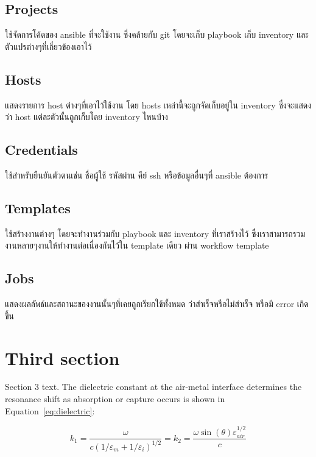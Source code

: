 \subsection{Projects}
\hspace{0.5in} ใช้จัดการโค้ดของ ansible ที่จะใช้งาน ซึ่งคล้ายกับ git โดยจะเก็บ playbook เก็บ inventory และตัวแปรต่างๆที่เกี่ยวข้องเอาไว้

\subsection{Hosts}
\hspace{0.5in} แสดงรายการ host ต่างๆที่เอาไว้ใช้งาน โดย hosts เหล่านี้จะถูกจัดเก็บอยู่ใน inventory ซึ่งจะแสดงว่า host แต่ละตัวนั้นถูกเก็บโดย inventory ไหนบ้าง

\subsection{Credentials}
\hspace{0.5in} ใช้สำหรับยืนยันตัวตนเช่น ชื่อผู้ใช้ รหัสผ่าน คีย์ ssh หรือข้อมูลอื่นๆที่ ansible ต้องการ

\subsection{Templates}
\hspace{0.5in} ใช้สร้างงานต่างๆ โดยจะทำงานร่วมกับ playbook และ inventory ที่เราสร้างไว้ ซึ่งเราสามารถรวม งานหลายๆงานให้ทำงานต่อเนื่องกันไว้ใน template เดียว ผ่าน workflow template

\subsection{Jobs}
\hspace{0.5in} แสดงผลลัพธ์และสถานะของงานนั้นๆที่เคยถูกเรียกใช้ทั้งหมด ว่าสำเร็จหรือไม่สำเร็จ หรือมี error เกิดขึ้น

\section{Third section}
Section 3 text. The dielectric constant
at the air-metal interface determines
the resonance shift as absorption or capture occurs
is shown in Equation~\eqref{eq:dielectric}:

\begin{equation}\label{eq:dielectric}
k_1=\frac{\omega}{c({1/\varepsilon_m + 1/\varepsilon_i})^{1/2}}=k_2=\frac{\omega
\sin(\theta)\varepsilon_\mathit{air}^{1/2}}{c}
\end{equation}

